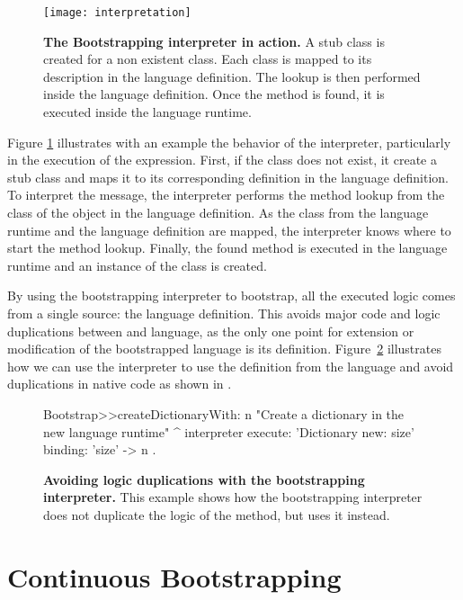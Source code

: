 \begin{figure}[!ht]
\center
\texttt{[image: interpretation]}
\caption{\textbf{The Bootstrapping interpreter in action.} A stub class is created for a non existent class. Each class is mapped to its description in the language definition. The lookup is then performed inside the language definition. Once the method is found, it is executed inside the language runtime.\label{fig:interpretation}}
\end{figure}

Figure \ref{fig:interpretation} illustrates with an example the behavior of the interpreter, particularly in the execution of the  expression. First, if the class  does not exist, it create a stub  class and maps it to its corresponding definition in the language definition. To interpret the  message, the interpreter performs the method lookup from the class of the object in the language definition. As the class from the language runtime and the language definition are mapped, the interpreter knows where to start the method lookup. Finally, the found method is executed in the language runtime and an instance of the  class is created.



By using the bootstrapping interpreter to bootstrap, all the executed logic comes from a single source: the language definition. This avoids  major code and logic duplications between \VM and language, as the only one point for extension or modification of the bootstrapped language is its definition. Figure~\ref{code:logic_dup3} illustrates how we can use the interpreter to use the  definition from the language and avoid duplications in native code as shown in .


\begin{figure}[ht]
\begin{code}
Bootstrap>>createDictionaryWith: n
    "Create a dictionary in the new language runtime"
    ^ interpreter
            execute: 'Dictionary new: size'
            binding: { 'size' -> n }.
\end{code}
\caption{\textbf{Avoiding logic duplications with the bootstrapping interpreter.} This example shows how the bootstrapping interpreter does not duplicate the logic of the  method, but uses it instead.\label{code:logic_dup3}}
\end{figure}


\section{Continuous Bootstrapping}\label{sec:continuous_bootstrapping}

